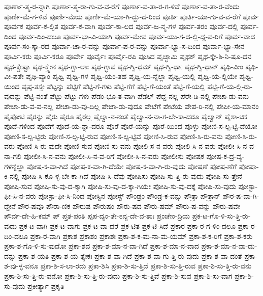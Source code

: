 {ಪೂರ್ಣಾ-ತ್ಮ-ರ-ನ್ನಾಗಿ
ಪೂರ್ಣಾ-ತ್ಮ-ರಾ-ಗು-ವ-ವ-ರೆಗೆ
ಪೂರ್ಣಾ-ವ-ತಾ-ರ-ಗ-ಳಿವೆ
ಪೂರ್ಣಾ-ವ-ತಾ-ರ-ವೆಂದು
ಪೂರ್ಣಿ-ಮೆ-ಗ-ಳಿವೆ
ಪೂರ್ಣಿ-ಮೆಯ
ಪೂರ್ಣಿ-ಮೆ-ಯಾ-ಗಿ-ದ್ದು-ದ-ರಿಂದ
ಪೂರ್ತಿ
ಪೂರ್ತಿ-ಯಾ-ಗು-ವ-ವ-ರೆಗೆ
ಪೂರ್ವ
ಪೂರ್ವಕ
ಪೂರ್ವ-ಕ-ಲ್ಪಿತ
ಪೂರ್ವ-ಕ-ವಾಗಿ
ಪೂರ್ವ-ಕಾ-ಲದ
ಪೂರ್ವ-ಜ-ನ್ಮ-ಗಳ
ಪೂರ್ವ-ತರಂ
ಪೂರ್ವ-ದಲ್ಲಿ
ಪೂರ್ವ-ದಿಂದ
ಪೂರ್ವ-ದಿಂ-ದಲೂ
ಪೂರ್ವ-ಭಾ-ವಿ-ಯಾಗಿ
ಪೂರ್ವ-ಮೇವ
ಪೂರ್ವ-ಯು-ಗ-ದ-ಲ್ಲಿ-ದ್ದ-ವ-ರಿಗೆ
ಪೂರ್ವ-ವಾದ
ಪೂರ್ವ-ಸಂ-ಸ್ಕಾ-ರದ
ಪೂರ್ವಾ-ಚಾ-ರ-ವನ್ನು
ಪೂರ್ವಾ-ಪ-ರ-ವನ್ನು
ಪೂರ್ವಾ-ಭ್ಯಾ-ಸ-ದಿಂದ
ಪೂರ್ವಾ-ಭ್ಯಾ-ಸೇನ
ಪೂರ್ವಿ-ಕರು
ಪೂರ್ವಿ-ಕರೂ
ಪೂರ್ವೇ
ಪೂರ್ವೈಃ
ಪೂರ್ವೈ-ರಪಿ
ಪೂಸಿದ
ಪೃಚ್ಛಾಮಿ
ಪೃಥಕ್
ಪೃಥ-ಕ್ಕೇ-ಶಿ-ನಿ-ಷೂ-ದನ
ಪೃಥ-ಕ್ಚೇಷ್ಟಾ
ಪೃಥ-ಕ್ತ್ವೇನ
ಪೃಥ-ಗ್ಬಾ-ಲಾಃ
ಪೃಥ-ಗ್ಭಾವ
ಪೃಥ-ಗ್ವಿ-ಧಮ್
ಪೃಥ-ಗ್ವಿ-ಧಾಃ
ಪೃಥ-ಗ್ವಿ-ಧಾನ್
ಪೃಥಿ-ವೀಂ
ಪೃಥಿ-ವೀ-ಪತೇ
ಪೃಥಿ-ವ್ಯಾಂ
ಪೃಥ್ವಿ
ಪೃಥ್ವಿ-ಗಳ
ಪೃಥ್ವಿ-ಯಂ-ತಹ
ಪೃಥ್ವಿ-ಯ-ನ್ನೆಲ್ಲಾ
ಪೃಥ್ವಿ-ಯಲ್ಲಿ
ಪೃಥ್ವಿ-ಯ-ಲ್ಲಿಯೇ
ಪೃಥ್ವಿ-ಯಿಂದ
ಪೃಷ್ಠ-ತಸ್ತೇ
ಪೆಟ್ಟನ್ನು
ಪೆಟ್ಟಿಗೆ
ಪೆಟ್ಟಿ-ಗೆ-ಗಳು
ಪೆಟ್ಟಿ-ಗೆಗೆ
ಪೆಟ್ಟಿ-ಗೆ-ಯಂತೆ
ಪೆಟ್ಟಿ-ಗೆ-ಯಲ್ಲಿ
ಪೆಟ್ಟಿ-ಗೆ-ಯ-ಲ್ಲಿ-ರು-ವುದನ್ನು
ಪೆಟ್ಟಿ-ನಂತೆ
ಪೆಟ್ಟು
ಪೆಟ್ಟು-ಗಳು
ಪೆಡಂ-ಭೂ-ತ-ವಾಗಿ
ಪೆಡಲ್
ಪೆದ್ದ-ನಲ್ಲ
ಪೆರೇ-ಡಿ-ನಲ್ಲಿ
ಪೇಚಾ-ಡು-ವನು
ಪೇಚಾ-ಡು-ವ-ವ-ನಲ್ಲ
ಪೇಚಾ-ಡು-ವು-ದಿಲ್ಲ
ಪೇಚಾ-ಡು-ವುದೂ
ಪೇಟೆಗೆ
ಪೇಟೆಯ
ಪೇಪ-ರಿ-ನಲ್ಲಿ
ಪೇಪೀ-ಯ-ಮಾನಂ
ಪೈಪೋಟಿ
ಪೈರನ್ನು
ಪೈರು
ಪೈರೂ
ಪೈರೆಲ್ಲ
ಪೈಲ್ವಾ-ನ-ನಂತೆ
ಪೈಲ್ವಾ-ನ-ನಾ-ಗ-ಬೇ-ಕಾ-ದರೂ
ಪೈಲ್ವಾನ್
ಪೈಶಾ-ಚಿಕ
ಪೊದೆ-ಗಳಿಂದ
ಪೊದೆಗೆ
ಪೊದೆ-ಯ-ನ್ನಾ-ದರೂ
ಪೊರೆ
ಪೊರೆ-ಯನ್ನು
ಪೊರೆ-ಯಿಂದ
ಪೊಳ್ಳು
ಪೋಣಿ-ಸ-ಲ್ಪ-ಟ್ಟಿ-ದೆಯೋ
ಪೋಣಿ-ಸ-ಲ್ಪ-ಟ್ಟಿರು
ಪೋಣಿ-ಸ-ಲ್ಪ-ಟ್ಟಿ-ರುವ
ಪೋಣಿ-ಸ-ಲ್ಪ-ಟ್ಟಿವೆ
ಪೋಣಿ-ಸಿ-ರುವ
ಪೋಣಿ-ಸಿ-ರು-ವನು
ಪೋಣಿ-ಸಿ-ರು-ವರು
ಪೋಣಿ-ಸಿ-ರು-ವುದೇ
ಪೋಣಿ-ಸುವ
ಪೋಣಿ-ಸು-ವನು
ಪೋಲಿ-ಸ-ನ-ವರು
ಪೋಲಿ-ಸಿ-ನ-ವರು
ಪೋಲೀ-ಸಿ-ನ-ವ-ನಾ-ಗಲಿ
ಪೋಲೀ-ಸಿ-ನ-ವನು
ಪೋಲೀ-ಸಿ-ನ-ವ-ರಿಗೆ
ಪೋಲೀ-ಸಿ-ನ-ವರು
ಪೋಲೀಸು
ಪೋಷಕ
ಪೋಷ-ಕ-ದ್ರ-ವ್ಯ-ಗಳನ್ನೆಲ್ಲಾ
ಪೋಷ-ಕ-ವಾ-ಗಿದೆ
ಪೋಷ-ಕ-ವಾ-ಗಿ-ದೆಯೇ
ಪೋಷ-ಕ-ವಾ-ಗಿ-ರು-ವುದು
ಪೋಷಣೆ
ಪೋಷ-ಣೆಗೆ
ಪೋಷಾ-ಕಿ-ನಲ್ಲಿ
ಪೋಷಿ-ಸಿ-ಕೊ-ಳ್ಳ-ಬೇ-ಕಾ-ಗಿದೆ
ಪೋಷಿ-ಸಿ-ದೆವು
ಪೋಷಿಸು
ಪೋಷಿ-ಸು-ತ್ತಿ-ರು-ವುದು
ಪೋಷಿ-ಸು-ತ್ತೇನೆ
ಪೋಷಿ-ಸುವ
ಪೋಷಿ-ಸು-ವು-ದ-ಕ್ಕಾಗಿ
ಪೋಷಿ-ಸು-ವು-ದ-ಕ್ಕಾ-ಗಿಯೇ
ಪೋಷಿ-ಸು-ವು-ದಕ್ಕೆ
ಪೋಷಿ-ಸು-ವುದು
ಪೋಸ್ಟಾ-ಫೀ-ಸಿ-ನ-ವರು
ಪೋಸ್ಟಾ-ಫೀ-ಸಿ-ನಿಂದ
ಪೋಸ್ಟಿನ
ಪೋಸ್ಟ್
ಪೌಂಡ್ರಂ
ಪೌಂಡ್ರ-ಕ-ವನ್ನು
ಪೌತ್ರಾ
ಪೌತ್ರಾನ್
ಪೌರ-ಷ-ವಾ-ಗಿ-ದ್ದೇನೆ
ಪೌರ-ಷವೂ
ಪೌರಾ-ಣಿಕ
ಪೌರುಷ
ಪೌರುಷಂ
ಪೌರು-ಷದ
ಪೌರು-ಷಮ್
ಪೌರು-ಷ-ವನ್ನು
ಪೌರು-ಷವೇ
ಪೌರ್ವ-ದೇ-ಹಿ-ಕಮ್
ಪ್
ಪ್ತತ-ಪಂತಿ
ಪ್ಪಪ-ದ್ಯಂ-ತೇ-ಽನ್ಯ-ದೇ-ವ-ತಾಃ
ಪ್ರಂಚೇಂ-ದ್ರಿಯ
ಪ್ರಕ-ಟ-ಗೊ-ಳಿ-ಸು-ತ್ತಿ-ರು-ವುದು
ಪ್ರಕ-ಟ-ವಾಗಿ
ಪ್ರಕ-ಟ-ವಾಗು
ಪ್ರಕ-ಟ-ವಾ-ದರೆ
ಪ್ರಕ-ಟಿತ
ಪ್ರಕ-ಟಿ-ಸಿದೆ
ಪ್ರಕಾರ
ಪ್ರಕಾ-ರ-ಗ-ಳಿಂ-ದಲೂ
ಪ್ರಕಾ-ರ-ದಿಂ-ದಲೂ
ಪ್ರಕಾ-ರ-ವಾಗಿ
ಪ್ರಕಾಶ
ಪ್ರಕಾಶಂ
ಪ್ರಕಾಶಃ
ಪ್ರಕಾ-ಶ-ಕ-ಮ-ನಾ-ಮ-ಯಮ್
ಪ್ರಕಾ-ಶ-ಕ-ರಿಗೆ
ಪ್ರಕಾ-ಶ-ಕರು
ಪ್ರಕಾ-ಶ-ಗೊ-ಳಿ-ಸು-ವುದೋ
ಪ್ರಕಾ-ಶದ
ಪ್ರಕಾ-ಶ-ಮಾ-ನ-ವಾ-ಗಿದೆ
ಪ್ರಕಾ-ಶ-ಮಾ-ನ-ವಾದ
ಪ್ರಕಾ-ಶ-ಮಾ-ನ-ವಾ-ದು-ದನ್ನು
ಪ್ರಕಾ-ಶ-ಯತಿ
ಪ್ರಕಾ-ಶ-ಯ-ತ್ಯೇಕಃ
ಪ್ರಕಾ-ಶ-ವಾ-ಗಿದೆ
ಪ್ರಕಾ-ಶ-ವಾ-ಗು-ತ್ತಿ-ರು-ವುದು
ಪ್ರಕಾ-ಶ-ವಾ-ದಂತೆ
ಪ್ರಕಾ-ಶ-ವು-ಳ್ಳ-ವನೂ
ಪ್ರಕಾ-ಶಿ-ಸ-ಲಾ-ರದು
ಪ್ರಕಾ-ಶಿಸಿ
ಪ್ರಕಾ-ಶಿ-ಸು-ತ್ತಿದೆ
ಪ್ರಕಾ-ಶಿ-ಸು-ತ್ತಿ-ರುವ
ಪ್ರಕಾ-ಶಿ-ಸು-ತ್ತಿ-ರು-ವನು
ಪ್ರಕಾ-ಶಿ-ಸು-ತ್ತಿ-ರು-ವನೋ
ಪ್ರಕಾ-ಶಿ-ಸು-ತ್ತಿ-ರು-ವುದು
ಪ್ರಕಾ-ಶಿ-ಸು-ತ್ತಿವೆ
ಪ್ರಕಾ-ಶಿ-ಸುವ
ಪ್ರಕಾ-ಶಿ-ಸು-ವಾಗ
ಪ್ರಕಾ-ಶಿ-ಸು-ವುದು
ಪ್ರಕೀರ್ತ್ಯಾ
ಪ್ರಕೃತಿ
}
